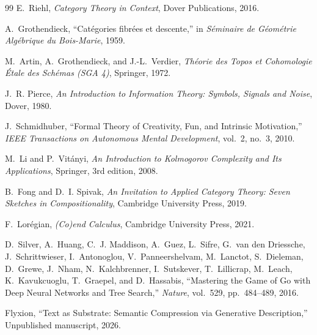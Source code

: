 \documentclass[12pt,a4paper]{article}
\theoremstyle{definition}
\theoremstyle{remark}
\begin{document}
\begin{thebibliography}{99}
E.~Riehl,
\newblock \emph{Category Theory in Context},
\newblock Dover Publications, 2016.

A.~Grothendieck,
\newblock ``Cat\'egories fibr\'ees et descente,''
\newblock in \emph{S\'eminaire de G\'eom\'etrie Alg\'ebrique du Bois-Marie}, 1959.

M.~Artin, A.~Grothendieck, and J.-L.~Verdier,
\newblock \emph{Th\'eorie des Topos et Cohomologie \'Etale des Sch\'emas (SGA 4)},
\newblock Springer, 1972.

J.~R. Pierce,
\newblock \emph{An Introduction to Information Theory: Symbols, Signals and Noise},
\newblock Dover, 1980.

J.~Schmidhuber,
\newblock ``Formal Theory of Creativity, Fun, and Intrinsic Motivation,''
\newblock \emph{IEEE Transactions on Autonomous Mental Development}, vol.~2, no.~3, 2010.

M.~Li and P.~Vit\'anyi,
\newblock \emph{An Introduction to Kolmogorov Complexity and Its Applications},
\newblock Springer, 3rd edition, 2008.

B.~Fong and D.~I. Spivak,
\newblock \emph{An Invitation to Applied Category Theory: Seven Sketches in Compositionality},
\newblock Cambridge University Press, 2019.

F.~Lor\'egian,
\newblock \emph{(Co)end Calculus},
\newblock Cambridge University Press, 2021.

D.~Silver, A.~Huang, C.~J. Maddison, A.~Guez, L.~Sifre, G.~van den Driessche, J.~Schrittwieser, I.~Antonoglou, V.~Panneershelvam, M.~Lanctot, S.~Dieleman, D.~Grewe, J.~Nham, N.~Kalchbrenner, I.~Sutskever, T.~Lillicrap, M.~Leach, K.~Kavukcuoglu, T.~Graepel, and D.~Hassabis,
\newblock ``Mastering the Game of Go with Deep Neural Networks and Tree Search,''
\newblock \emph{Nature}, vol.~529, pp.~484--489, 2016.

Flyxion,
\newblock ``Text as Substrate: Semantic Compression via Generative Description,''
\newblock Unpublished manuscript, 2026.

\end{thebibliography}
\end{document}
